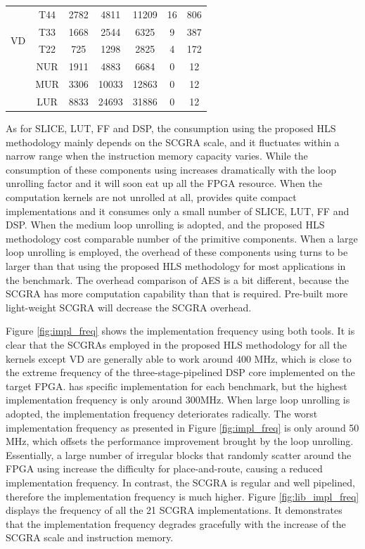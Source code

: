 \begin{table}[h]
\begin{tabular}{|c|c|c|c|c|c|c|}
\multirow{4}{*}{VD} & T44 & 2782 & 4811 & 11209 & 16 & 806\\
\cline{2-7}
& T33 & 1668 & 2544 & 6325 & 9 & 387\\
\cline{2-7}
& T22 & 725 & 1298 & 2825 & 4 & 172\\
\cline{2-7}

& NUR & 1911 & 4883 & 6684 & 0 & 12\\
\cline{2-7}
& MUR & 3306 & 10033 & 12863 & 0 & 12\\
\cline{2-7}
& LUR & 8833 & 24693 & 31886 & 0 & 12\\
\hline
\end{tabular}
\vspace{-1em}
\end{table}

As for SLICE, LUT, FF and DSP, the consumption using the proposed HLS methodology mainly depends on the SCGRA scale, and it fluctuates within a narrow range when the instruction memory capacity varies. While the consumption of these components using \autoesl increases dramatically with the loop unrolling factor and it will soon eat up all the FPGA resource. When the computation kernels are not unrolled at all, \autoesl provides quite compact implementations and it consumes only a small number of SLICE, LUT, FF and DSP. When the medium loop unrolling is adopted, \autoesl and the proposed HLS methodology cost comparable number of the primitive components. When a large loop unrolling is employed, the overhead of these components using \autoesl turns to be larger than that using the proposed HLS methodology for most applications in the benchmark. The overhead comparison of AES is a bit different, because the SCGRA has more computation capability than that is required. Pre-built more light-weight SCGRA will decrease the SCGRA overhead.

Figure \ref{fig:impl_freq} shows the implementation frequency using both tools. It is clear that the SCGRAs employed in the proposed HLS methodology for all the kernels except VD are generally able to work around 400 MHz, which is close to the extreme frequency of the three-stage-pipelined DSP core implemented on the target FPGA. \autoesl has specific implementation for each benchmark, but the highest implementation frequency is only around 300MHz. When large loop unrolling is adopted, the implementation frequency deteriorates radically. The worst implementation frequency as presented in Figure \ref{fig:impl_freq} is only around 50 MHz, which offsets the performance improvement brought by the loop unrolling. Essentially, a large number of irregular blocks that randomly scatter around the FPGA using \autoesl increase the difficulty for place-and-route, causing a reduced implementation frequency. In contrast, the SCGRA is regular and well pipelined, therefore the implementation frequency is much higher. Figure \ref{fig:lib_impl_freq} displays the frequency of all the 21 SCGRA implementations. It demonstrates that the implementation frequency degrades gracefully with the increase of the SCGRA scale and instruction memory. 

